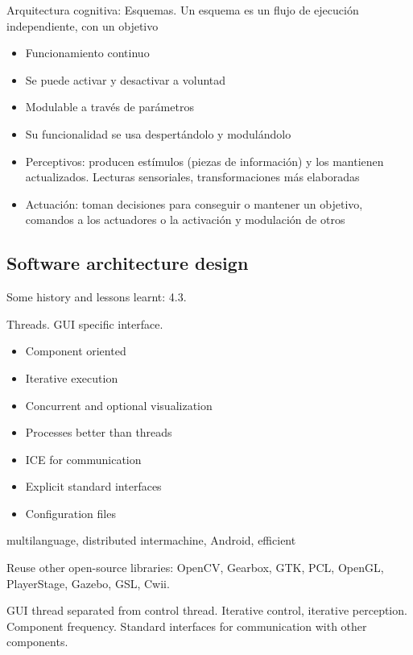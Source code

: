 \documentclass[twocolumn]{svjour3}          %
\begin{document}
Arquitectura cognitiva: Esquemas.
Un {esquema} es un flujo de ejecución independiente, con un objetivo
\begin{itemize}
\item Funcionamiento continuo
\item Se puede activar y desactivar a voluntad
\item Modulable a través de parámetros
\item Su funcionalidad se usa despertándolo y modulándolo
\item {Perceptivos}: producen estímulos (piezas de información) y los mantienen actualizados. Lecturas sensoriales, transformaciones más elaboradas 
\item {Actuación}: toman decisiones para conseguir o mantener un objetivo, comandos a los actuadores o la activación y modulación de otros 
\end{itemize}














\subsection{Software architecture design}

Some history and lessons learnt: 4.3. 

Threads. GUI specific interface. 

\begin{itemize}
\item Component oriented 
\item Iterative execution
\item Concurrent and optional visualization
\item Processes better than threads
\item ICE for communication
\item Explicit standard interfaces
\item Configuration files 
\end{itemize}

multilanguage, distributed intermachine, Android, efficient

Reuse other open-source libraries: OpenCV, Gearbox, GTK, PCL, OpenGL, PlayerStage, Gazebo, GSL, Cwii.


GUI thread separated from control thread.
Iterative control, iterative perception. Component frequency.
Standard interfaces for communication with other components.
\end{document}

